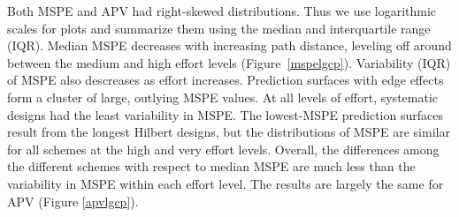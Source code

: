 \documentclass[review]{elsarticle}
\begin{document}
Both MSPE and APV had right-skewed distributions. Thus we use logarithmic
scales for plots and summarize them using the median and interquartile range
(IQR). Median MSPE decreases with increasing path distance, leveling off
around between the medium and high effort levels (Figure~\ref{mspelgcp}).
Variability (IQR) of MSPE also descreases as effort increases. Prediction
surfaces with edge effects form a cluster of large, outlying MSPE values. At
all levels of effort, systematic designs had the least variability in MSPE.
The lowest-MSPE prediction surfaces result from the longest Hilbert designs,
but the distributions of MSPE are similar for all schemes at the high and very
effort levels. Overall, the differences among the different schemes with
respect to median MSPE are much less than the variability in MSPE within each
effort level. The results are largely the same for APV (Figure \ref{apvlgcp}).



\end{document}
